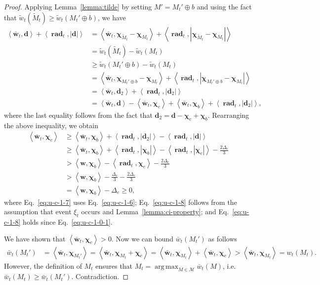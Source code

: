 \documentclass{article}
\newcommand{\M}{\mathcal M}
\DeclareMathOperator{\rad}{rad}
\DeclareMathOperator*{\argmax}{arg\,max}
\newcommand{\inn}[1]{\left\langle #1 \right\rangle}
\renewcommand{\vec}[1]{\boldsymbol{#1}}
\begin{document}
\begin{proof}
Applying Lemma~\ref{lemma:tilde} by setting $M' = M_t' \oplus b$ and using the fact that $\tilde w_t(\tilde M_t) \ge \tilde w_t(M_t' \oplus b)$, we have 
\begin{align*}
\inn{\vec {\bar w}_t, \vec d}+\inn{\vec \rad_t, |\vec d|}
& = \inn{\vec {\bar w}_t, \vec \chi_{\tilde M_t}-\vec\chi_{M_t}}+\inn{\vec \rad_t, |\vec \chi_{\tilde M_t}-\vec\chi_{M_t}|}\\
& = \tilde w_t(\tilde M_t)- \tilde w_t(M_t)\\
& \ge \tilde w_t(M_t'\oplus b) - \tilde w_t(M_t)\\
&= \inn{\vec {\bar w}_t, \vec \chi_{M_t' \oplus b}-\vec\chi_{M_t}}+\inn{\vec \rad_t, |\vec \chi_{M_t' \oplus b}-\vec\chi_{M_t}|}\\
&= \inn{\vec {\bar w}_t, \vec d_2}+\inn{\vec \rad_t, |\vec d_2|} \\
									  &= \inn{\vec {\bar w}_t, \vec d}-\inn{\vec {\bar w}_t, \vec \chi_c}+\inn{\vec {\bar w}_t,\vec\chi_b}+\inn{\vec \rad_t, |\vec d_2|},
\end{align*}
where the last equality follows from the fact that $\vec d_2 = \vec d-\vec \chi_{c}+\vec \chi_{b}$.
Rearranging the above inequality, we obtain
\begin{align}
\inn{\vec {\bar w}_t, \vec \chi_c} &\ge \inn{\vec {\bar w}_t, \vec \chi_b}+\inn{\vec \rad_t, |\vec d_2|}-\inn{\vec \rad_t, |\vec d|}\nonumber \\
&\ge  \inn{\vec {\bar w}_t, \vec \chi_b}+
\left\langle \vec \rad_t, |\vec\chi_b| \right\rangle
  -\left\langle \vec \rad_t, |\vec\chi_c| \right\rangle
  -\frac{2\Delta_e}{3} \label{eq:u-c-1-7}\\
&> \inn{\vec w, \vec \chi_b}-\inn{\vec \rad_t, \vec \chi_c}-\frac{2\Delta_e}{3} \label{eq:u-c-1-8}\\
&> \inn{\vec w, \vec \chi_b}-\frac{\Delta_e}{3}-\frac{2\Delta_e}{3} \label{eq:u-c-1-9}\\
&= \inn{\vec w, \vec \chi_b}-\Delta_e \ge 0,
\end{align}
where Eq.~\eqref{eq:u-c-1-7} uses Eq.~\eqref{eq:u-c-1-6}; 
Eq.~\eqref{eq:u-c-1-8} follows from the assumption that event $\xi_t$ occurs and Lemma~\ref{lemma:ci-property};
and Eq.~\eqref{eq:u-c-1-8} holds since Eq.~\eqref{eq:u-c-1-0-1}.

We have shown that $\inn{\vec {\bar w}_t,\vec \chi_c}>0$. Now we can bound $\bar w_t(M_t')$ as follows
\begin{align*}
 \bar w_t(M_t') &= \inn{\vec {\bar w}_t, \vec \chi_{M_t'}} = \inn{\vec {\bar w}_t, \vec \chi_{M_t}+\vec \chi_c} =
 \inn{\vec {\bar w}_t, \vec \chi_{M_t}}+\inn{\vec {\bar w}_t, \vec \chi_c} > \inn{\vec {\bar w}_t, \vec \chi_{M_t}} = w_t(M_t).
\end{align*}
However, the definition of $M_t$ ensures that $M_t = \argmax_{M\in\M} \bar w_t(M)$, i.e. $\bar w_t(M_t) \ge \bar w_t(M_t')$. Contradiction.


\end{proof}
\end{document}
